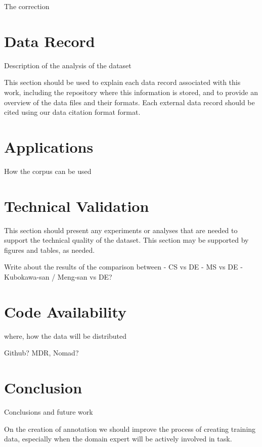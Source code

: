 \documentclass[a4paper,10pt]{article}
\begin{document}
The correction


\section{Data Record}
Description of the analysis of the dataset 

This section should be used to explain each data record associated with this work, including the repository where this information is stored, and to provide an overview of the data files and their formats. Each external data record should be cited using our data citation format format.



\section{Applications}
How the corpus can be used

\section{Technical Validation} 
This section should present any experiments or analyses that are needed to support the technical quality of the dataset. This section may be supported by figures and tables, as needed.

Write about the results of the comparison between 
- CS vs DE 
- MS vs DE
- Kubokawa-san / Meng-san vs DE? 


\section{Code Availability}
where, how the data will be distributed 

Github? MDR, Nomad? 


\section{Conclusion}
Conclusions and future work 

On the creation of annotation we should improve the process of creating training data, especially when the domain expert will be actively involved in task. 


  
\end{document}
